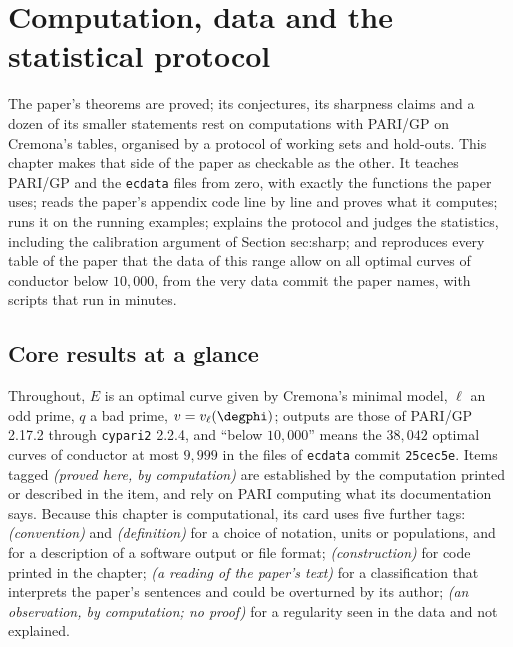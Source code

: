 \chapter{Computation, data and the statistical protocol}\label{ch:computation}

The paper's theorems are proved; its conjectures, its sharpness claims and a dozen of its smaller statements rest on computations with PARI/GP on
Cremona's tables, organised by a protocol of working sets and hold-outs. This chapter makes that side of the paper as checkable as the other. It
teaches PARI/GP and the \texttt{ecdata} files from zero, with exactly the functions the paper uses; reads the paper's appendix code line by line and
proves what it computes; runs it on the running examples; explains the protocol and judges the statistics, including the calibration argument
of Section sec:sharp; and reproduces every table of the paper that the data of this range allow on all optimal curves of conductor below $10{,}000$, from the
very data commit the paper names, with scripts that run in minutes.

\section*{Core results at a glance}

Throughout, $E$ is an optimal curve given by Cremona's minimal model, $\ell$ an odd prime, $q$ a bad prime, $v=v_\ell(\degphi)$; outputs are those of PARI/GP
2.17.2 through \texttt{cypari2} 2.2.4, and ``below $10{,}000$'' means the $38{,}042$ optimal curves of conductor at most $9{,}999$ in the files of \texttt{ecdata}
commit \texttt{25cec5e}. Items tagged \emph{(proved here, by computation)} are established by the computation printed or described in the item, and
rely on PARI computing what its documentation says. Because this chapter is computational, its card uses five further tags:
\emph{(convention)} and \emph{(definition)} for a choice of notation, units or populations, and for a description of a software output or file format;
\emph{(construction)} for code printed in the chapter; \emph{(a reading of the paper's text)} for a classification that interprets the paper's sentences
and could be overturned by its author; \emph{(an observation, by computation; no proof)} for a regularity seen in the data and not explained.

